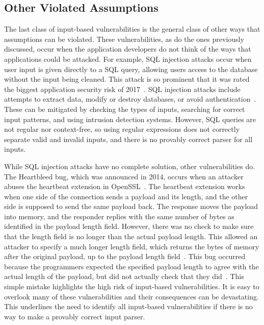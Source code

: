\subsection{Other Violated Assumptions}
\label{sec:otherViolatedAssumptions}
The last class of input-based vulnerabilities is the general class of other ways that assumptions can be violated.  These vulnerabilities, as do the ones previously discussed, occur when the application developers do not think of the ways that applications could be attacked.  For example, SQL injection attacks occur when user input is given directly to a SQL query, allowing users access to the database without the input being cleaned.  This attack is so prominent that it was rated the biggest application security risk of 2017~\cite{owasp_2018}.  SQL injection attacks include attempts to extract data, modify or destroy databases, or avoid authentication~\cite{halfond2006classification}.  These can be mitigated by checking the types of inputs, searching for correct input patterns, and using intrusion detection systems.  However, SQL queries are not regular nor context-free, so using regular expressions does not correctly separate valid and invalid inputs, and there is no provably correct parser for all inputs.

While SQL injection attacks have no complete solution, other vulnerabilities do.  The Heartbleed bug, which was announced in 2014, occurs when an attacker abuses the heartbeat extension in OpenSSL~\cite{mehta_codenomicon_2014}.  The heartbeat extension works when one side of the connection sends a payload and its length, and the other side is supposed to send the same payload back.  The response moves the payload into memory, and the responder replies with the same number of bytes as identified in the payload length field.  However, there was no check to make sure that the length field is no longer than the actual payload length.  This allowed an attacker to specify a much longer length field, which returns the bytes of memory after the original payload, up to the payload length field~\cite{Durumeric_2014_MH_2663716_2663755}.  This bug occurred because the programmers expected the specified payload length to agree with the actual length of the payload, but did not actually check that they did~\cite{bratus2017parsing}.  This simple mistake highlights the high risk of input-based vulnerabilities.  It is easy to overlook many of these vulnerabilities and their consequences can be devastating.  This underlines the need to identify all input-based vulnerabilities if there is no way to make a provably correct input parser.

